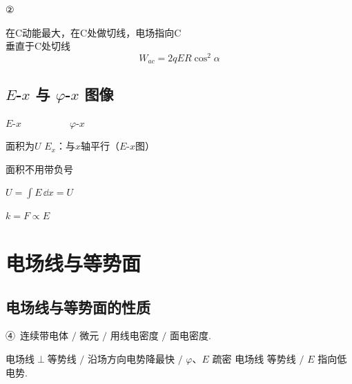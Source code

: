②

在C动能最大，在C处做切线，电场指向C\\
垂直于C处切线
\[ W_{ac}=2qER\cos^{2}\alpha \]

\subsection{$E$-$x$ 与 $\varphi$-$x$ 图像}
\noindent $E$-$x$　　　　　$\varphi$-$x$

\noindent 面积为$U$
\noindent $E_x$：与$x$轴平行（$E$-$x$图）%

\noindent 面积不用带负号


$U=\displaystyle\int E\,\dd x=U$ %

$k=F\propto E$ %




\section{电场线与等势面}
\subsection{电场线与等势面的性质}
④\ 连续带电体 $/$ 微元 $/$ 用线电密度 $/$ 面电密度.

电场线$\perp$等势线 $/$ 沿场方向电势降最快 $/$ $\varphi$、$E$ 疏密 电场线 等势线 $/$ $E$ 指向低电势.

